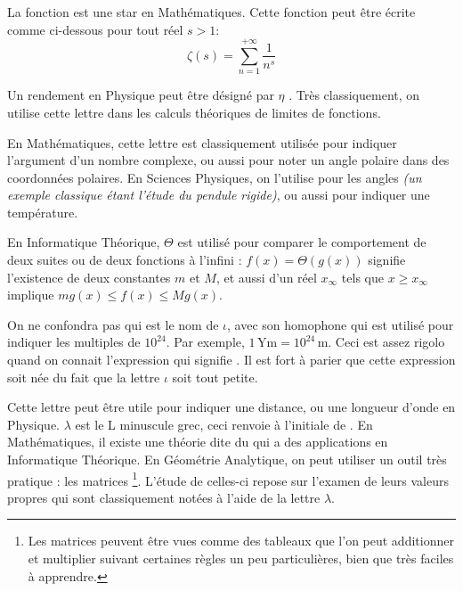 \cadre{$\zeta$} La fonction  est une star en Mathématiques. Cette fonction peut être écrite comme ci-dessous pour tout réel $s > 1$:
\begin{equation}
	\zeta(s) = \sum_{n=1}^{+\infty} \frac{1}{n^s}
\end{equation}


\vspace{-0.3em}

\cadre{$\eta$} Un rendement en Physique peut être désigné par $\eta$ . Très classiquement, on utilise cette lettre dans les calculs théoriques de limites de fonctions.


\cadre{$\theta$} En Mathématiques, cette lettre est classiquement utilisée pour indiquer l'argument d’un nombre complexe, ou aussi pour noter un angle polaire dans des coordonnées polaires. En Sciences Physiques, on l'utilise pour les angles \emph{(un exemple classique étant l'étude du pendule rigide)}, ou aussi pour indiquer une température.


\cadre{$\Theta$} En Informatique Théorique, $\Theta$ est utilisé pour comparer le comportement de deux suites ou de deux fonctions à l'infini : $f(x) = \Theta\left(g(x)\right)$ signifie l'existence de deux constantes $m$ et $M$, et aussi d'un réel $x_\infty$ tels que $x \geqslant x_\infty$
implique $m g(x) \leqslant f(x) \leqslant M g(x)$.


\cadre{$\iota$} On ne confondra pas  qui est le nom de $\iota$, avec son homophone  qui est utilisé pour indiquer les multiples de $10^{24}$. Par exemple, $1 \, \si{\yotta\metre} = 10^{24} \, \si{\metre}$. Ceci est assez rigolo quand on connait l'expression  qui signifie . Il est fort à parier que cette expression soit née du fait que la lettre $\iota$ soit tout petite.


\cadre{$\lambda$} Cette lettre peut être utile pour indiquer une distance, ou une longueur d'onde en Physique. $\lambda$ est le L minuscule grec, ceci renvoie à l'initiale de .
En Mathématiques, il existe une théorie dite du  qui a des applications en Informatique Théorique.
En Géométrie Analytique, on peut utiliser un outil très pratique : les matrices
	\footnote{Les matrices peuvent être vues comme des tableaux que l'on peut additionner et multiplier suivant certaines règles un peu particulières, bien que très faciles à apprendre.}.
L'étude de celles-ci repose sur l'examen de leurs valeurs propres qui sont classiquement notées à l'aide de la lettre $\lambda$.


